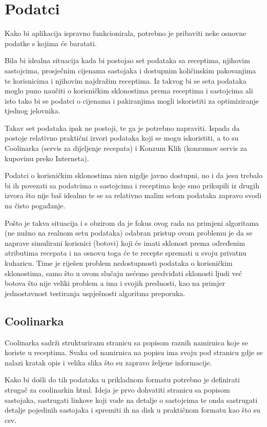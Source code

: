 \chapter{Podatci}

Kako bi aplikacija ispravno funkcionirala, potrebno je pribaviti neke osnovne podatke s kojima će baratati.

Bila bi idealna situacija kada bi postojao set podataka sa receptima, njihovim sastojcima, prosječnim cijenama sastojaka i dostupnim količinskim pakovanjima te korisnicima i njihovim najdražim receptima. Iz takvog bi se seta podataka moglo puno naučiti o korisničkim sklonostima prema receptima i sastojcima ali isto tako bi se podatci o cijenama i pakiranjima mogli iskoristiti za optimiziranje tjednog jelovnika.

Takav set podataka ipak ne postoji, te ga je potrebno napraviti. Ispada da postoje relativno praktični izvori podataka koji se mogu iskoristiti, a to su Coolinarka (servis za dijeljenje recepata) i Konzum Klik (konzumov servis za kupovinu preko Interneta).

Podatci o korisničkim sklonostima nisu nigdje javno dostupni, no i da jesu trebalo bi ih povezati sa podatcima o sastojcima i receptima koje smo prikupili iz drugih izvora što nije baš idealno te se sa relativno malim setom podataka zapravo svodi na čisto pogađanje.

Pošto je takva situacija i s obzirom da je fokus ovog rada na primjeni algoritama (ne nužno na realnom setu podataka) odabran pristup ovom problemu je da se naprave simulirani korisnici (botovi) koji će imati sklonost prema određenim atributima recepata i na osnovu toga će te recepte spremati u svoju privatnu kuharicu. Time je riješen problem nedostupnosti podataka o korisničkim sklonostima, samo što u ovom slučaju nećemo predviđati sklonosti ljudi već botova što nije veliki problem a ima i svojih prednosti, kao na primjer jednostavnost testiranja uspješnosti algoritma preporuka.

\section{Coolinarka}

Coolinarka sadrži strukturiranu stranicu sa popisom raznih namirnica koje se koriste u receptima. Svaka od namirnica na popisu ima svoju pod stranicu gdje se nalazi kratak opis i velika slika što su zapravo željene informacije.

Kako bi došli do tih podataka u prikladnom formatu potrebno je definirati strugač za coolinarkin \ac{html}. Ideja je prvo dohvatiti stranicu sa popisom sastojaka, sastrugati linkove koji vode na detalje o sastojcima te onda sastrugati detalje pojedinih sastojaka i spremiti ih na disk u praktičnom formatu kao što su \ac{csv}.

